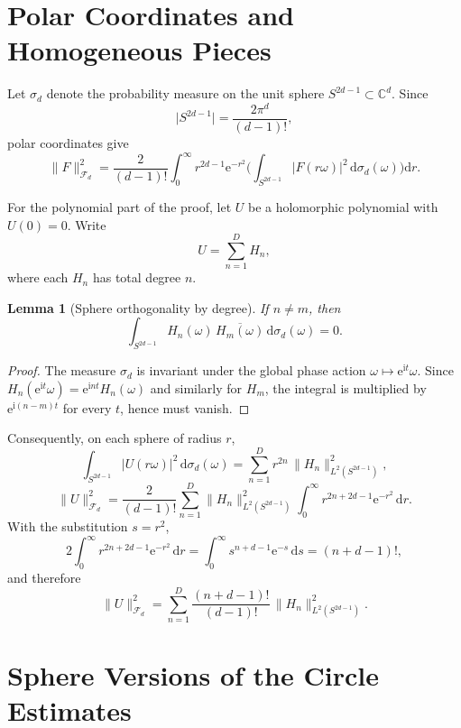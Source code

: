 \documentclass[11pt]{amsart}
\newtheorem{lemma}[theorem]{Lemma}
\theoremstyle{remark}
\newcommand{\C}{\mathbb{C}}
\newcommand{\abs}[1]{\lvert #1 \rvert}
\newcommand{\norm}[1]{\lVert #1 \rVert}
\newcommand{\dd}{\mathrm{d}}
\newcommand{\ee}{\mathrm{e}}
\newcommand{\ii}{\mathrm{i}}
\newcommand{\Fd}{\mathcal{F}_d}
\newcommand{\Sphere}{S^{2d-1}}
\begin{document}
\section{Polar Coordinates and Homogeneous Pieces}\label{sec:polar}

Let $\sigma_d$ denote the probability measure on the unit sphere
$\Sphere \subset \C^d$.  Since
\[
\abs{\Sphere}
=
\frac{2\pi^d}{(d-1)!},
\]
polar coordinates give
\begin{equation}\label{eq:polar}
\norm{F}_{\Fd}^2
=
\frac{2}{(d-1)!}
\int_0^\infty
r^{2d-1} \ee^{-r^2}
\biggl(
\int_{\Sphere} \abs{F(r\omega)}^2\,\dd \sigma_d(\omega)
\biggr)\dd r.
\end{equation}

For the polynomial part of the proof, let $U$ be a holomorphic polynomial
with $U(0)=0$.  Write
\[
U = \sum_{n=1}^D H_n,
\]
where each $H_n$ has total degree $n$.

\begin{lemma}[Sphere orthogonality by degree]\label{lem:sphere-orth}
If $n \ne m$, then
\[
\int_{\Sphere}
H_n(\omega)\, \overline{H_m(\omega)}\, \dd \sigma_d(\omega)
=
0.
\]
\end{lemma}

\begin{proof}
The measure $\sigma_d$ is invariant under the global phase action
$\omega \mapsto \ee^{\ii t}\omega$.  Since
$H_n(\ee^{\ii t}\omega) = \ee^{\ii nt} H_n(\omega)$ and similarly for $H_m$,
the integral is multiplied by $\ee^{\ii(n-m)t}$ for every $t$, hence must
vanish.
\end{proof}

Consequently, on each sphere of radius $r$,
\[
\int_{\Sphere} \abs{U(r\omega)}^2\,\dd \sigma_d(\omega)
=
\sum_{n=1}^D r^{2n}\, \norm{H_n}_{L^2(\Sphere)}^2,
\]
\[
\norm{U}_{\Fd}^2
=
\frac{2}{(d-1)!}
\sum_{n=1}^D
\norm{H_n}_{L^2(\Sphere)}^2
\int_0^\infty r^{2n+2d-1}\ee^{-r^2}\,\dd r.
\]
With the substitution $s=r^2$,
\[
2\int_0^\infty r^{2n+2d-1}\ee^{-r^2}\,\dd r
=
\int_0^\infty s^{n+d-1}\ee^{-s}\,\dd s
=
(n+d-1)!,
\]
and therefore
\begin{equation}\label{eq:fock-by-degree}
\norm{U}_{\Fd}^2
=
\sum_{n=1}^D
\frac{(n+d-1)!}{(d-1)!}\,
\norm{H_n}_{L^2(\Sphere)}^2.
\end{equation}

\section{Sphere Versions of the Circle Estimates}
\end{document}
